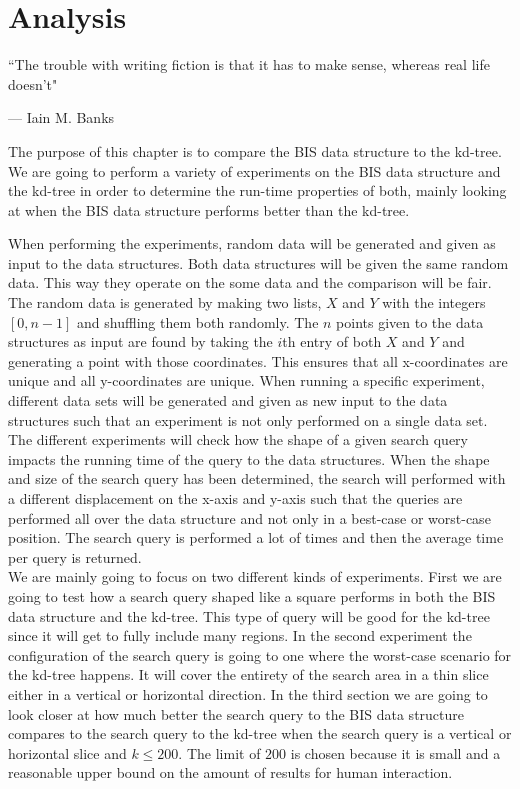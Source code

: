 \chapter{Analysis}
\label{ch:analysis}
\epigraph{``The trouble with writing fiction is that it has to make sense, whereas real life doesn't"}{--- \textup{Iain M. Banks}}

The purpose of this chapter is to compare the BIS data structure to the kd-tree. We are going to perform a variety of experiments on the BIS data structure and the kd-tree in order to determine the run-time properties of both, mainly looking at when the BIS data structure performs better than the kd-tree.


When performing the experiments, random data will be generated and given as input to the data structures. Both data structures will be given the same random data. This way they operate on the some data and the comparison will be fair. The random data is generated by making two lists, $X$ and $Y$ with the integers $[0,n-1]$ and shuffling them both randomly. The $n$ points given to the data structures as input are found by taking the $i$th entry of both $X$ and $Y$ and generating a point with those coordinates. This ensures that all x-coordinates are unique and all y-coordinates are unique. When running a specific experiment, different data sets will be generated and given as new input to the data structures such that an experiment is not only performed on a single data set. The different experiments will check how the shape of a given search query impacts the running time of the query to the data structures. When the shape and size of the search query has been determined, the search will performed with a different displacement on the x-axis and y-axis such that the queries are performed all over the data structure and not only in a best-case or worst-case position. The search query is performed a lot of times and then the average time per query is returned. \\

We are mainly going to focus on two different kinds of experiments. First we are going to test how a search query shaped like a square performs in both the BIS data structure and the kd-tree. This type of query will be good for the kd-tree since it will get to fully include many regions. In the second experiment the configuration of the search query is going to one where the worst-case scenario for the kd-tree happens. It will cover the entirety of the search area in a thin slice either in a vertical or horizontal direction. In the third section we are going to look closer at how much better the search query to the BIS data structure compares to the search query to the kd-tree when the search query is a vertical or horizontal slice and $k \leq 200$. The limit of $200$ is chosen because it is small and a reasonable upper bound on the amount of results for human interaction.\\

